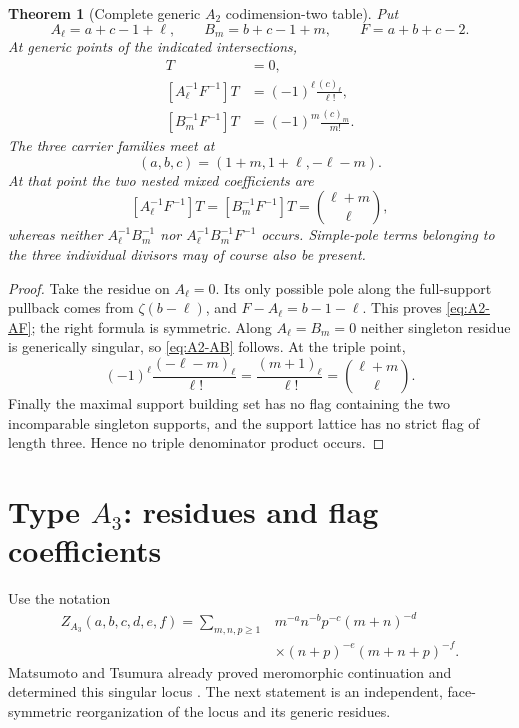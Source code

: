 \documentclass[11pt]{article}
\newtheorem{theorem}{Theorem}[section]
\begin{document}
\begin{theorem}[Complete generic \(A_2\) codimension-two table]
\label{thm:A2-strata}
Put
\[
 A_\ell=a+c-1+\ell,\qquad
 B_m=b+c-1+m,\qquad
 F=a+b+c-2.
\]
At generic points of the indicated intersections,
\begin{align}
 [A_\ell^{-1}B_m^{-1}]T&=0,\label{eq:A2-AB}\\
 [A_\ell^{-1}F^{-1}]T
 &=(-1)^\ell\frac{(c)_\ell}{\ell!},\label{eq:A2-AF}\\
 [B_m^{-1}F^{-1}]T
 &=(-1)^m\frac{(c)_m}{m!}.\label{eq:A2-BF}
\end{align}
The three carrier families meet at
\[
 (a,b,c)=(1+m,1+\ell,-\ell-m).
\]
At that point the two nested mixed coefficients are
\[
 [A_\ell^{-1}F^{-1}]T
 =[B_m^{-1}F^{-1}]T
 =\binom{\ell+m}{\ell},
\]
whereas neither \(A_\ell^{-1}B_m^{-1}\) nor
\(A_\ell^{-1}B_m^{-1}F^{-1}\) occurs.  Simple-pole terms belonging to
the three individual divisors may of course also be present.
\end{theorem}

\begin{proof}
Take the residue on \(A_\ell=0\).  Its only possible pole along the
full-support pullback comes from
\(\zeta(b-\ell)\), and
\(F-A_\ell=b-1-\ell\).  This proves
\eqref{eq:A2-AF}; the right formula is symmetric.  Along
\(A_\ell=B_m=0\) neither singleton residue is generically singular,
so \eqref{eq:A2-AB} follows.  At the triple point,
\[
 (-1)^\ell\frac{(-\ell-m)_\ell}{\ell!}
 =\frac{(m+1)_\ell}{\ell!}
 =\binom{\ell+m}{\ell}.
\]
Finally the maximal support building set has no flag containing the two
incomparable singleton supports, and the support lattice has no strict
flag of length three.  Hence no triple denominator product occurs.
\end{proof}

\section{Type \texorpdfstring{$A_3$}{A3}: residues and flag coefficients}

Use the notation
\begin{equation}\label{eq:A3}
\begin{aligned}
 Z_{A_3}(a,b,c,d,e,f)
 =\sum_{m,n,p\geq1}&m^{-a}n^{-b}p^{-c}(m+n)^{-d}\\
 &\times(n+p)^{-e}(m+n+p)^{-f}.
\end{aligned}
\end{equation}
Matsumoto and Tsumura already proved meromorphic continuation and
determined this singular locus \cite{MatsumotoTsumura2006}.  The next
statement is an independent, face-symmetric reorganization of the locus
and its generic residues.
\end{document}
